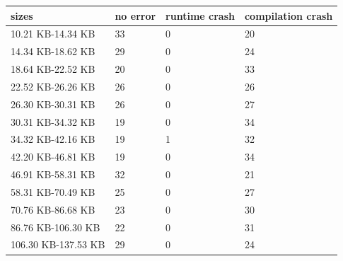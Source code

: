 \documentclass[a4paper,11pt,oneside]{report}
\begin{document}
\begin{table}[H]
    \begin{tabular}{llll}
        \hline
        sizes               & \multicolumn{1}{l}{no error} & \multicolumn{1}{l}{runtime crash} & \multicolumn{1}{l}{compilation crash} \\
        \hline
        10.21 KB-14.34 KB   & 33                           & 0                                 & 20                                    \\
        14.34 KB-18.62 KB   & 29                           & 0                                 & 24                                    \\
        18.64 KB-22.52 KB   & 20                           & 0                                 & 33                                    \\
        22.52 KB-26.26 KB   & 26                           & 0                                 & 26                                    \\
        26.30 KB-30.31 KB   & 26                           & 0                                 & 27                                    \\
        30.31 KB-34.32 KB   & 19                           & 0                                 & 34                                    \\
        34.32 KB-42.16 KB   & 19                           & 1                                 & 32                                    \\
        42.20 KB-46.81 KB   & 19                           & 0                                 & 34                                    \\
        46.91 KB-58.31 KB   & 32                           & 0                                 & 21                                    \\
        58.31 KB-70.49 KB   & 25                           & 0                                 & 27                                    \\
        70.76 KB-86.68 KB   & 23                           & 0                                 & 30                                    \\
        86.76 KB-106.30 KB  & 22                           & 0                                 & 31                                    \\
        106.30 KB-137.53 KB & 29                           & 0                                 & 24                                    \\

\end{tabular}
\end{table}
\end{document}
